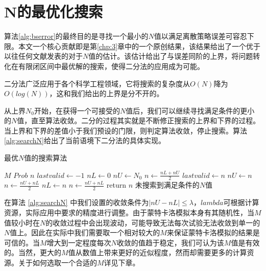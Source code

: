 \section{N的最优化搜索}
\label{sec:searchN}
算法\ref{alg:bserror}的最终目的是寻找一个最小的$N$值以满足离散策略误差可容忍下限。本文一个核心贡献即是第\ref{chp:3}章中的一个原创结果，该结果给出了一个优于以往任何文献发表的对于$N$值的估计。该估计给出了与误差同阶的上界，将问题转化在有限闭区间中最优解的搜索，使得二分法的应用成为可能。

二分法广泛应用于各个科学工程领域，它将搜索的复杂度从$O(N)$降为$O(log(N))$，这和我们给出的上界是分不开的。

从上界$N_0$开始，在获得一个可接受的$N$值后，我们可以继续寻找满足条件的更小的$N$值，直至算法收敛。二分的过程其实就是不断修正搜索的上界和下界的过程。当上界和下界的差值小于我们预设的门限，则判定算法收敛，停止搜索。算法\ref{alg:searchN}给出了当前语境下二分法的具体实现。
\begin{algorithm}
	\caption{最优$N$值的搜索算法}
	\label{alg:searchN}
	\begin{algorithmic}[1]
	  \Require $M$ 
          \Require $Prob$ 
          \Ensure $n$ 
	   
          \State $lastvalid \gets -1$ 
	  \State $nL \gets 0$  
	  \State $nU \gets N_0$ 
	  \State $n \gets \frac{nL + nU}{2}$
	   
          \State $lastvalid \gets n$
	  \State $nU \gets n$
	  \State $n \gets \frac{nU + nL}{2}$		
	  \Else  {}
	  \State $nL \gets n$
	  \State $n \gets \frac{nU + nL}{2}$
	  \EndIf
	  \EndWhile
	  \State return $n$
          \Else 
          \State $未搜索到满足条件的N值$ 
          \EndIf 
	  \EndProcedure
	\end{algorithmic}
\end{algorithm}
在算法 \ref{alg:searchN} 中我们设置的收敛条件为$|nU - nL| \le \lambda$，$lambda$可根据计算资源，实际应用中要求的精度进行调整。由于蒙特卡洛模拟本身有其随机性，当$M$值较小时在$N$的收敛过程中会出现波动，可能导致无法每次试验无法收敛到单一的$N$值上。因此在实际中我们需要取一个相对较大的$M$来保证蒙特卡洛模拟的结果是可信的。当$M$增大到一定程度每次$N$收敛的值趋于稳定，我们可认为该$M$值是有效的。当然，更大的$M$值从数值上带来更好的近似程度，然而却需要更多的计算资源。关于如何选取一个合适的$M$详见下章。

